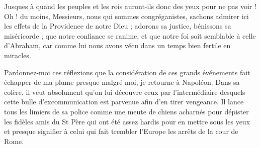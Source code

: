 Jusques à quand les peuples et les rois auront-ils donc des yeux pour ne pas voir ! Oh ! du moins, Messieurs, nous qui sommes congréganistes, sachons admirer ici les effets de la Providence de notre Dieu ; adorons sa justice, bénissons sa miséricorde ; que notre confiance se ranime, et que notre foi soit semblable à celle d'Abraham, car comme lui nous avons vécu dans un temps bien fertile en miracles.

Pardonnez-moi ces réflexions que la considération de ces grands événements fait échapper de ma plume presque malgré moi, je retourne à Napoléon. Dans sa colère, il veut absolument qu'on lui découvre ceux par l'intermédiaire desquels cette bulle d'excommunication est parvenue afin d'en tirer vengeance. Il lance tous les limiers de sa police comme une meute de chiens acharnés pour dépister les fidèles amis du St Père qui ont été assez hardis pour en mettre sous les yeux et presque signifier à celui qui fait trembler l'Europe les arrêts de la cour de Rome.

